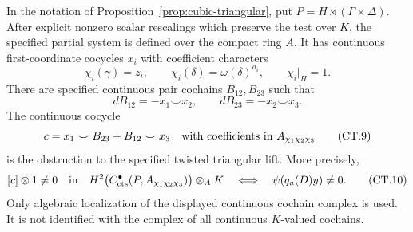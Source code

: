 \begin{proposition}
\label{prop:cubic-twisted}
In the notation of Proposition~\ref{prop:cubic-triangular}, put
\(P=H\rtimes(\Gamma\times\Delta)\). After explicit nonzero scalar
rescalings which preserve the test over \(K\), the specified partial
system is defined over the compact ring \(A\). It has continuous
first-coordinate cocycles \(x_i\) with coefficient characters
\[
 \chi_i(\gamma)=z_i,\qquad
 \chi_i(\delta)=\omega(\delta)^{a_i},\qquad
 \chi_i|_H=1.
 \tag{CT.8}
\]
There are specified continuous pair cochains \(B_{12},B_{23}\) such that
\[
 dB_{12}=-x_1\smile x_2,\qquad dB_{23}=-x_2\smile x_3.
\]
The continuous cocycle
\[
 c=x_1\smile B_{23}+B_{12}\smile x_3
 \quad\hbox{with coefficients in }A_{\chi_1\chi_2\chi_3}
 \tag{CT.9}
\]
is the obstruction to the specified twisted triangular lift. More
precisely,
\[
 [c]\otimes1\ne0
 \quad\hbox{in}\quad
 H^2\bigl(C^\bullet_{\rm cts}(P,A_{\chi_1\chi_2\chi_3})\bigr)
       \otimes_A K
 \quad\Longleftrightarrow\quad
 \psi(q_a(D)y)\ne0.
 \tag{CT.10}
\]
Only algebraic localization of the displayed continuous cochain complex
is used. It is not identified with the complex of all continuous
\(K\)-valued cochains.
\end{proposition}

